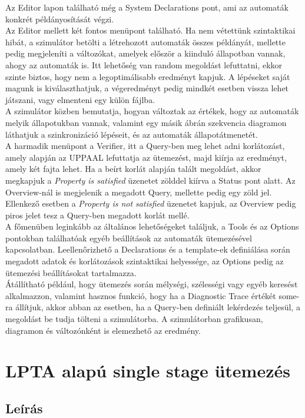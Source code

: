\documentclass {report}
\begin{document}
Az Editor lapon található még a System Declarations pont, ami az automaták konkrét példányosítását végzi.\\
Az Editor mellett két fontos menüpont található. Ha nem vétettünk szintaktikai hibát, a szimulátor betölti a létrehozott automaták összes példányát, mellette pedig megjeleníti a változókat, amelyek először a kiinduló állapotban vannak, ahogy az automaták is. Itt lehetőség van random megoldást lefuttatni, ekkor szinte biztos, hogy nem a legoptimálisabb eredményt kapjuk. A lépéseket saját magunk is kiválaszthatjuk, a végeredményt pedig mindkét esetben vissza lehet játszani, vagy elmenteni egy külön fájlba.  \\
A szimulátor közben bemutatja, hogyan változtak az értékek, hogy az automaták melyik állapotukban vannak, valamint egy másik ábrán szekvencia diagramon láthatjuk a szinkronizáció lépéseit, és az automaták állapotátmenetét.\\
A harmadik menüpont a Verifier, itt a Query-ben meg lehet adni korlátozást, amely alapján az UPPAAL lefuttatja az ütemezést, majd kiírja az eredményt, amely két fajta lehet. Ha a beírt korlát alapján talált megoldást, akkor megkapjuk a \emph{Property is satisfied} üzenetet zölddel kiírva a Status pont alatt. Az Overview-nál is megjelenik a megadott Query, mellette pedig egy zöld jel. Ellenkező esetben a \emph{Property is not satisfied} üzenetet kapjuk, az Overview pedig piros jelet tesz a Query-ben megadott korlát mellé.    \\
A főmenüben leginkább az általános lehetőségeket találjuk, a Tools és az Options pontokban találhatóak egyéb beállítások az automaták ütemezésével kapcsolatban. Leellenőrizhető a Declarations és a template-ek definiálása során megadott adatok és korlátozások szintaktikai helyessége, az Options pedig az ütemezési beállításokat tartalmazza. \\
Átállítható például, hogy ütemezés során mélységi, szélességi vagy egyéb keresést alkalmazzon, valamint hasznos funkció, hogy ha a Diagnostic Trace értékét some-ra állítjuk, akkor abban az esetben, ha a Query-ben definiált lekérdezés teljesül, a megoldást be tudja tölteni a szimulátorba. A szimulátorban grafikusan, diagramon és változónként is elemezhető az eredmény.   

\chapter{LPTA alapú single stage ütemezés}
    \section{Leírás}
\end{document}
